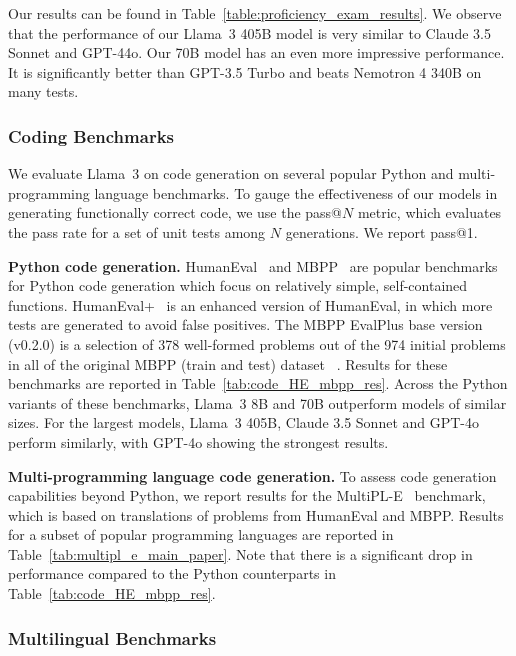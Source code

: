 Our results can be found in Table~\ref{table:proficiency_exam_results}. We observe that the performance of our Llama~3 405B model is very similar to Claude 3.5 Sonnet and GPT-44o. Our 70B model has an even more impressive performance. It is significantly better than GPT-3.5 Turbo and beats Nemotron 4 340B on many tests.

\subsubsection{Coding Benchmarks}
\label{subsubsec:code_evals}
We evaluate Llama~3 on code generation on several popular Python and multi-programming language benchmarks. To gauge the effectiveness of our models in generating functionally correct code, we use the pass@$N$ metric, which evaluates the pass rate for a set of unit tests among $N$ generations. We report pass@1.

\textbf{Python code generation.} HumanEval~\citep{chen2021evaluating} and  MBPP~\citep{austin2021program} are popular benchmarks for Python code generation which focus on relatively simple, self-contained functions. HumanEval+~\citep{liu2024your} is an enhanced version of HumanEval, in which more tests are generated to avoid false positives. The MBPP EvalPlus base version (v0.2.0) is a selection of 378 well-formed problems out of the 974 initial problems in all of the original MBPP (train and test) dataset ~\citep{liu2024your}. Results for these benchmarks are reported in Table~\ref{tab:code_HE_mbpp_res}.
Across the Python variants of these benchmarks, Llama~3 8B and 70B outperform models of similar sizes. For the largest models, Llama~3 405B, Claude 3.5 Sonnet and GPT-4o perform similarly, with GPT-4o showing the strongest results. 

\textbf{Multi-programming language code generation.} To assess code generation capabilities beyond Python, we report results for the MultiPL-E~\citep{cassano2022multiple} benchmark, which is based on translations of problems from HumanEval and MBPP. Results for a subset of popular programming languages are reported in Table~\ref{tab:multipl_e_main_paper}. Note that there is a significant drop in performance compared to the Python counterparts in Table~\ref{tab:code_HE_mbpp_res}.

\subsubsection{Multilingual Benchmarks}
\label{multilingual_results}

